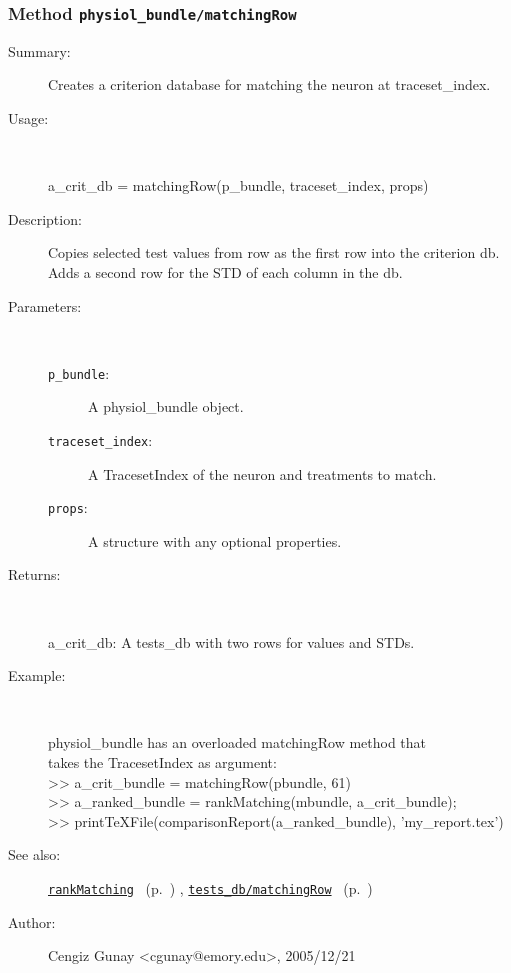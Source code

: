 \subsubsection[Method \texttt{matchingRow}]{Method \texttt{physiol\_bundle/matchingRow}}%
%
\label{ref_physiol_bundle__matchingRow}%
\hypertarget{ref_physiol_bundle__matchingRow}{}%
\begin{description}
\item[Summary:]Creates a criterion database for matching the neuron at traceset\_index.
%
\item[Usage:]~%
\begin{lyxcode}%
a\_crit\_db = matchingRow(p\_bundle, traceset\_index, props)
%
\end{lyxcode}%
%
\item[Description:]%
Copies selected test values from row as the first row into the 
 criterion db. Adds a second row for the STD of each column in the db.
\item[Parameters:]~
\begin{description}%
\item[\texttt{p\_bundle}:]
 A physiol\_bundle object.
\item[\texttt{traceset\_index}:]
 A TracesetIndex of the neuron and treatments to match.
\item[\texttt{props}:]
 A structure with any optional properties.
\end{description}%
%
\item[Returns:
]~

	a\_crit\_db: A tests\_db with two rows for values and STDs.
%
\item[Example:]~
\begin{lyxcode}        physiol\_bundle has an overloaded matchingRow method that
\\%
        takes the TracesetIndex as argument:
\\%
        >> a\_crit\_bundle = matchingRow(pbundle, 61)
\\%
        >> a\_ranked\_bundle = rankMatching(mbundle, a\_crit\_bundle);
\\%
        >> printTeXFile(comparisonReport(a\_ranked\_bundle), 'my\_report.tex')
\\%
\end{lyxcode}
%
\item[See also:]%
\hyperlink{ref_rankMatching}{\texttt{rankMatching}}%
\ (p.~\pageref{ref_rankMatching})%
%
, \hyperlink{ref_tests_db__matchingRow}{\texttt{tests\_db/matchingRow}}%
\ (p.~\pageref{ref_tests_db__matchingRow})%
%
%
\item[Author:]%
Cengiz Gunay <cgunay@emory.edu>, 2005/12/21
%
\end{description}
\methodline%
